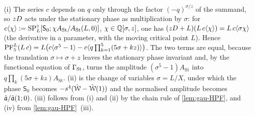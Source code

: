 \begin{sketch}
(i) The series $c$ depends on $q$ only through the factor $(-q)^{\sigma/z}$ of the summand, so $zD$ acts under the stationary phase as multiplication by $\sigma$: for $c\langle\chi\rangle:=\mathrm{SP}^{\circ}_L[\mathsf S_0;\chi A_{\mathrm{St}}/A_{\mathrm{St}}(L,0)]$, $\chi\in\mathbb{Q}[\sigma,z]$, one has $(zD+L)(L\,c\langle\chi\rangle)=L\,c\langle\sigma\chi\rangle$ (the derivative in a parameter, with the moving critical point $L$). Hence $\mathrm{PF}_{5}^L(L\,c)=L\bigl(c\langle\sigma^5-1\rangle-c\langle q\prod_{k=1}^5(5\sigma+kz)\rangle\bigr)$. The two terms are equal, because the translation $\sigma\mapsto\sigma+z$ leaves the stationary phase invariant and, by the functional equation of $\Gamma_{\mathrm{St}}$, turns the amplitude $(\sigma^5-1)A_{\mathrm{St}}$ into $q\prod_k(5\sigma+kz)A_{\mathrm{St}}$. (ii) is the change of variables $\sigma=L/X$, under which the phase $\mathsf S_0$ becomes $-s^4(\hat{\mathcal{W}}-\hat{\mathcal{W}}(1))$ and the normalised amplitude becomes $\hat{\mathfrak{a}}/\hat{\mathfrak{a}}(1;0)$. (iii) follows from (i) and (ii) by the chain rule of \cref{lem:gau-HPF}, and (iv) from \cref{lem:gau-HPF}~(iii).
\end{sketch}


